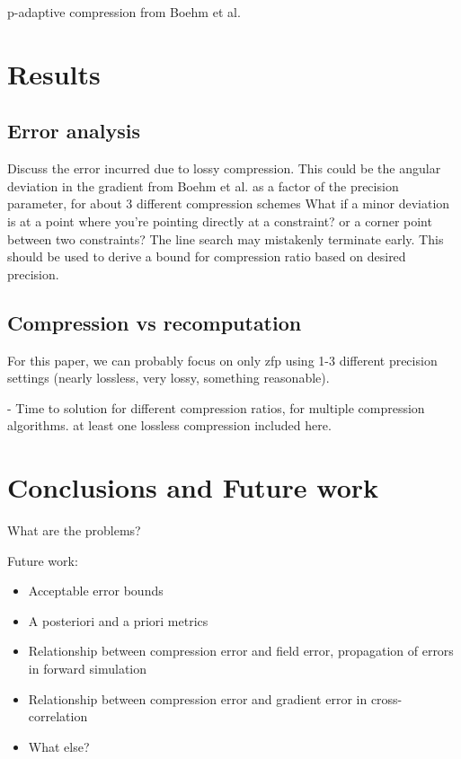 \documentclass[conference]{IEEEtran}
\begin{document}
p-adaptive compression from Boehm et al. 
\section{Results}
\subsection{Error analysis}
Discuss the error incurred due to lossy compression. This could be the
angular deviation in the gradient from Boehm et al. as a factor of the
precision parameter, for about 3 different compression schemes  What if a minor
deviation is at a point where you're pointing directly at a
constraint? or a corner point between two constraints? The line search
may mistakenly terminate early. This should be used to derive a bound
for compression ratio based on desired precision. 

\subsection{Compression vs recomputation}

For this paper, we can probably focus on only zfp using 1-3 different precision settings
(nearly lossless, very lossy, something reasonable).

- Time to solution for different compression ratios, for multiple
compression algorithms. at least one lossless compression included
here.



\section{Conclusions and Future work}

What are the problems?

Future work:
\begin{itemize}
\item Acceptable error bounds
\item A posteriori and a priori metrics
\item Relationship between compression error and field error, propagation of errors in forward simulation
\item Relationship between compression error and gradient error in cross-correlation
\item What else?
\end{itemize}
\end{document}
